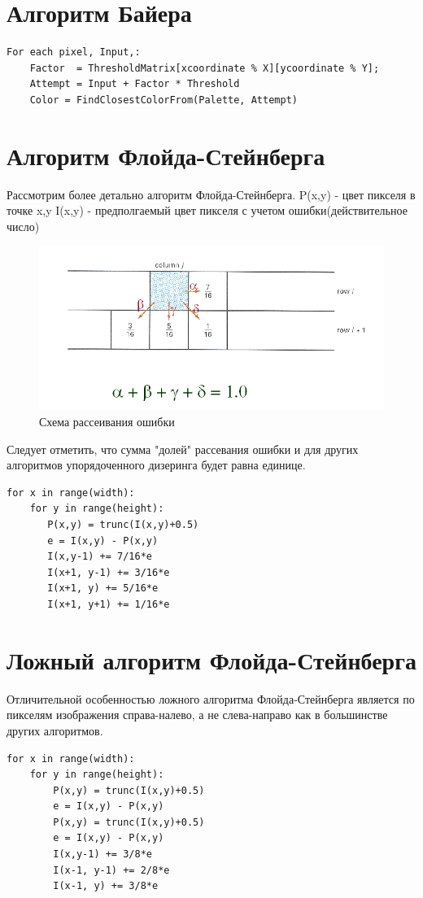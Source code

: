 \section{Алгоритм Байера}
  
  \begin{lstlisting}[style=pseudocode,caption={Алгоритм Флойда-Стейнберга}]
For each pixel, Input,:
    Factor  = ThresholdMatrix[xcoordinate % X][ycoordinate % Y];
    Attempt = Input + Factor * Threshold
    Color = FindClosestColorFrom(Palette, Attempt)
  \end{lstlisting}
\section{Алгоритм Флойда-Стейнберга}
Рассмотрим более детально алгоритм Флойда-Стейнберга.
P(x,y) - цвет пикселя в точке x,y
I(x,y) - предполгаемый цвет пикселя с учетом ошибки(действительное число)
\begin{figure}[h!]
	\centering
 	\includegraphics[width=\textwidth]{img/1.png}
	\caption{Схема рассеивания ошибки}
	\label{fig:spire03}
\end{figure}
Следует отметить, что сумма "долей" рассевания ошибки и для других алгоритмов упорядоченного дизеринга будет равна единице.
\begin{lstlisting}[style=pseudocode,caption={Алгоритм Флойда-Стейнберга}]
for x in range(width):
    for y in range(height):
       P(x,y) = trunc(I(x,y)+0.5)
       e = I(x,y) - P(x,y)
       I(x,y-1) += 7/16*e
       I(x+1, y-1) += 3/16*e
       I(x+1, y) += 5/16*e
       I(x+1, y+1) += 1/16*e
\end{lstlisting}
\section{Ложный алгоритм Флойда-Стейнберга}
Отличительной особенностью ложного алгоритма Флойда-Стейнберга является по пикселям изображения справа-налево, а не слева-направо как в большинстве других алгоритмов.
\begin{lstlisting}[style=pseudocode,caption={Ложный алгоритм Флойда-Стейнберга}]
for x in range(width):
    for y in range(height):
        P(x,y) = trunc(I(x,y)+0.5)
        e = I(x,y) - P(x,y)
        P(x,y) = trunc(I(x,y)+0.5)
        e = I(x,y) - P(x,y)
        I(x,y-1) += 3/8*e
        I(x-1, y-1) += 2/8*e
        I(x-1, y) += 3/8*e
\end{lstlisting}
